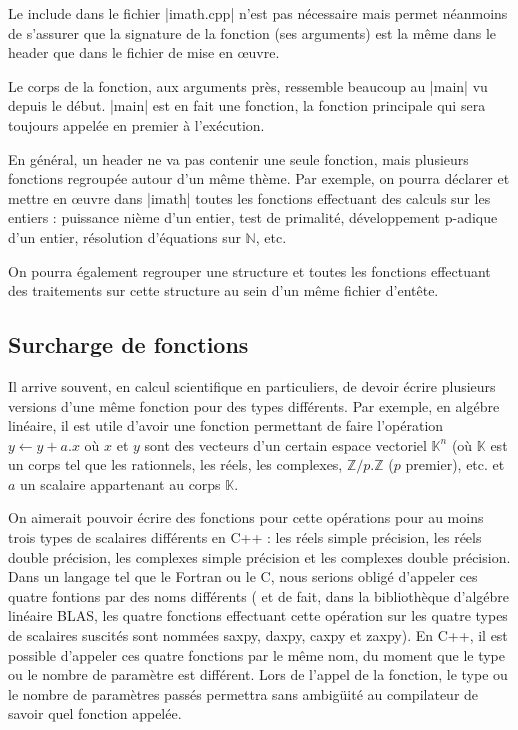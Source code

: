 Le include dans le fichier |imath.cpp| n'est pas nécessaire mais permet néanmoins
de s'assurer que la signature de la fonction (ses arguments) est la même dans le
header que dans le fichier de mise en {\oe}uvre.

Le corps de la fonction, aux arguments près, ressemble beaucoup au |main| vu depuis le début. |main| est en fait une fonction, la fonction principale qui sera toujours appelée
en premier à l'exécution.

En général, un header ne va pas contenir une seule fonction, mais plusieurs fonctions
regroupée autour d'un même thème. Par exemple, on pourra déclarer et mettre en {\oe}uvre
dans |imath| toutes les fonctions effectuant des calculs sur les entiers : puissance nième d'un entier, test de primalité, développement p-adique d'un entier, résolution d'équations sur $\mathbb{N}$, etc.

On pourra également regrouper une structure et toutes les fonctions effectuant des traitements sur cette structure au sein d'un même fichier d'entête.

\subsection{Surcharge de fonctions}

Il arrive souvent, en calcul scientifique en particuliers, de devoir écrire plusieurs versions d'une même fonction pour des types différents. Par exemple, en algébre linéaire, il est utile d'avoir une fonction permettant de faire l'opération $y\leftarrow y + a.x$
où $x$ et $y$ sont des vecteurs d'un certain espace vectoriel $\mathbb{K}^{n}$ (où
$\mathbb{K}$ est un corps tel que les rationnels, les réels, les complexes,
$\mathbb{Z}/p.\mathbb{Z}$ ($p$ premier), etc. et $a$ un scalaire appartenant au corps 
$\mathbb{K}$.

On aimerait pouvoir écrire des fonctions pour cette opérations pour au moins trois types de scalaires différents en C++ : les réels simple précision, les réels double précision, les complexes simple précision et les complexes double précision. Dans un langage tel que le Fortran ou le C, nous serions obligé d'appeler ces quatre fontions par des noms différents ( et de fait, dans la bibliothèque d'algébre linéaire BLAS, les quatre fonctions effectuant cette opération sur les quatre types de scalaires suscités sont nommées saxpy, daxpy, caxpy et zaxpy). En C++, il est possible d'appeler ces quatre fonctions par le même nom, du moment que le type ou le nombre de paramètre est différent. Lors de l'appel de la fonction, le type ou le nombre de paramètres passés permettra sans ambigüité au compilateur de savoir quel fonction appelée.

